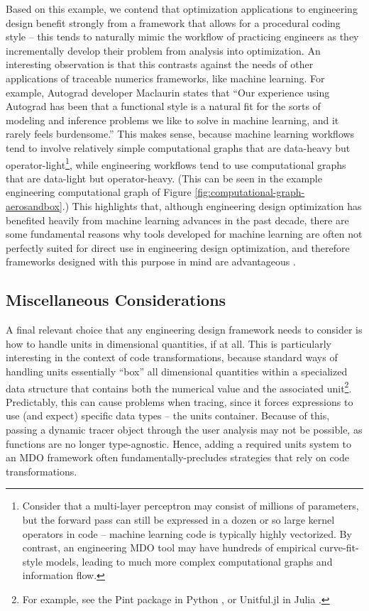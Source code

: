Based on this example, we contend that optimization applications to engineering design benefit strongly from a framework that allows for a procedural coding style -- this tends to naturally mimic the workflow of practicing engineers as they incrementally develop their problem from analysis into optimization. An interesting observation is that this contrasts against the needs of other applications of traceable numerics frameworks, like machine learning. For example, Autograd developer Maclaurin \cite{maclaurin_modeling_2016} states that ``Our experience using Autograd has been that a functional style is a natural fit for the sorts of modeling and inference problems we like to solve in machine learning, and it rarely feels burdensome.'' This makes sense, because machine learning workflows tend to involve relatively simple computational graphs that are data-heavy but operator-light\footnote{Consider that a multi-layer perceptron may consist of millions of parameters, but the forward pass can still be expressed in a dozen or so large kernel operators in code -- machine learning code is typically highly vectorized. By contrast, an engineering MDO tool may have hundreds of empirical curve-fit-style models, leading to much more complex computational graphs and information flow.}, while engineering workflows tend to use computational graphs that are data-light but operator-heavy. (This can be seen in the example engineering computational graph of Figure \ref{fig:computational-graph-aerosandbox}.) This highlights that, although engineering design optimization has benefited heavily from machine learning advances in the past decade, there are some fundamental reasons why tools developed for machine learning are often not perfectly suited for direct use in engineering design optimization, and therefore frameworks designed with this purpose in mind are advantageous \cite{rackauckas_engineering_2021}.

\subsection{Miscellaneous Considerations}

A final relevant choice that any engineering design framework needs to consider is how to handle units in dimensional quantities, if at all. This is particularly interesting in the context of code transformations, because standard ways of handling units essentially ``box'' all dimensional quantities within a specialized data structure that contains both the numerical value and the associated unit\footnote{For example, see the Pint package in Python \cite{pint}, or Unitful.jl in Julia \cite{unitful}.}. Predictably, this can cause problems when tracing, since it forces expressions to use (and expect) specific data types -- the units container. Because of this, passing a dynamic tracer object through the user analysis may not be possible, as functions are no longer type-agnostic. Hence, adding a required units system to an MDO framework often fundamentally-precludes strategies that rely on code transformations.

